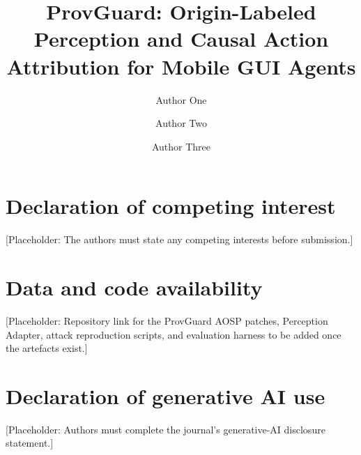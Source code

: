 \documentclass[preprint,12pt]{elsarticle}
\theoremstyle{plain}
\theoremstyle{definition}
\theoremstyle{remark}
\newcommand{\placeholder}[1]{\textcolor{pgRed}{\textsf{[Placeholder: #1]}}}
\begin{document}
\begin{frontmatter}

\title{ProvGuard: Origin-Labeled Perception and Causal Action Attribution for Mobile GUI Agents}

\author[inst1]{Author One}
\author[inst1]{Author Two}
\author[inst2]{Author Three}



\end{frontmatter}













\section*{Declaration of competing interest}
\placeholder{The authors must state any competing interests before submission.}

\section*{Data and code availability}
\placeholder{Repository link for the ProvGuard AOSP patches, Perception Adapter, attack reproduction scripts, and evaluation harness to be added once the artefacts exist.}

\section*{Declaration of generative AI use}
\placeholder{Authors must complete the journal's generative-AI disclosure statement.}




\appendix


\end{document}
